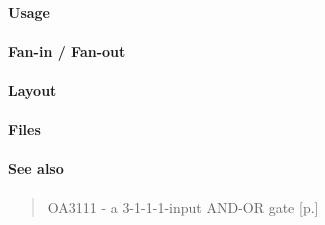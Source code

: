 \paragraph{Usage}

\paragraph{Fan-in / Fan-out}

\paragraph{Layout}

\paragraph{Files}

\paragraph{See also}
\begin{quote}
    OA3111 - a 3-1-1-1-input AND-OR gate [p.\pageref{OA3111}]
\end{quote}
